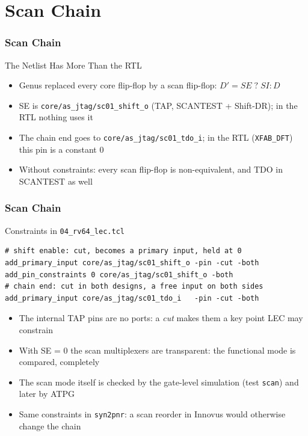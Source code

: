 \documentclass{beamer}
\newcommand{\astitle}{nix}
\newcommand{\assubtitle}{nix}
\newcommand{\cmd}[1]{\texttt{#1}}
\begin{document}
\section{Scan Chain}
\renewcommand{\astitle}{Scan Chain}

\renewcommand{\assubtitle}{The Netlist Has More Than the RTL}
\begin{frame}
\frametitle{\astitle}
\begin{block}{\assubtitle}
  \begin{itemize}
    \item Genus replaced every core flip-flop by a scan flip-flop:
      $D' = SE\;?\;SI : D$
    \item SE is \cmd{core/as\_jtag/sc01\_shift\_o} (TAP, SCANTEST +
      Shift-DR); in the RTL nothing uses it
    \item The chain end goes to \cmd{core/as\_jtag/sc01\_tdo\_i}; in the
      RTL (\cmd{XFAB\_DFT}) this pin is a constant 0
    \item Without constraints: every scan flip-flop is non-equivalent,
      and TDO in SCANTEST as well
  \end{itemize}
\end{block}
\end{frame}

\renewcommand{\assubtitle}{Constraints in \texttt{04\_rv64\_lec.tcl}}
\begin{frame}[fragile]
\frametitle{\astitle}
\begin{block}{\assubtitle}
\begin{lstlisting}[style=sh]
# shift enable: cut, becomes a primary input, held at 0
add_primary_input core/as_jtag/sc01_shift_o -pin -cut -both
add_pin_constraints 0 core/as_jtag/sc01_shift_o -both
# chain end: cut in both designs, a free input on both sides
add_primary_input core/as_jtag/sc01_tdo_i   -pin -cut -both
\end{lstlisting}
  \begin{itemize}
    \item The internal TAP pins are no ports: a \emph{cut} makes them a
      key point LEC may constrain
    \item With SE = 0 the scan multiplexers are transparent: the
      functional mode is compared, completely
    \item The scan mode itself is checked by the gate-level simulation
      (test \cmd{scan}) and later by ATPG
    \item Same constraints in \cmd{syn2pnr}: a scan reorder in Innovus
      would otherwise change the chain
  \end{itemize}
\end{block}
\end{frame}
\end{document}
